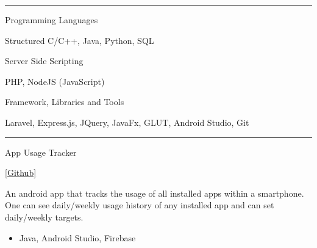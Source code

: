 \documentclass[a4paper,10pt]{article}
\newlength{\cvcolumngapwidth}
\newlength{\cvleftcolumnwidth}
\newlength{\cvrightcolumnwidth}
\newcommand{\cvsectionstyle}[1]{{\normalsize\cvsectionfont\textcolor{cvsectioncolor}{#1}}}
\newcommand{\cvtitlestyle}[1]{{\large\cvtitlefont\textcolor{cvtitlecolor}{#1}}}
\newcommand{\cvheadingstyle}[1]{{\normalsize\cvheadingfont\textcolor{cvheadingcolor}{#1}}}
\newlength{\cvafteritemskipamount}
\newlength{\cvaftersectionskipamount}
\newlength{\cvbetweensectionandheadingextraskipamount}
\newlength{\cvaftertitleskipamount}
\newlength{\cvparskip}
\newcommand{\cvsection}[1]{
    \begin{minipage}[t]{\cvleftcolumnwidth}
        \raggedleft\cvsectionstyle{#1}
    \end{minipage}%
    \hspace{\cvcolumngapwidth}%
    \begin{minipage}[t]{\cvrightcolumnwidth}
        \textcolor{cvrulecolor}{\rule{\cvrightcolumnwidth}{0.3mm}}
    \end{minipage}

    \vspace{\cvaftersectionskipamount}
}
\newcommand{\cvitem}[2]{
    \begin{minipage}[t]{\cvleftcolumnwidth}
        \raggedleft #1
    \end{minipage}%
    \hspace{\cvcolumngapwidth}%
    \begin{minipage}[t]{\cvrightcolumnwidth}
        \setlength{\parskip}{\cvparskip} #2
    \end{minipage}

    \vspace{\cvafteritemskipamount}
}
\newcommand{\cvtitle}[1]{
    \cvtitlestyle{#1}

    \vspace{\cvaftertitleskipamount}
    \vspace{-\cvparskip}
}
\begin{document}

\cvsection{TECHNICAL SKILLS}

\vspace{\cvbetweensectionandheadingextraskipamount}

\cvitem{
    \cvheadingstyle{Programming Languages}
}{
    Structured C/C++, Java, Python, SQL
}

\cvitem{
    \cvheadingstyle{Server Side Scripting}
}{
    PHP, NodeJS (JavaScript)
}

\cvitem{
    \cvheadingstyle{Framework, Libraries and Tools}
}{
     Laravel, Express.js, JQuery, JavaFx, GLUT, Android Studio, Git
}

\cvsection{PROJECTS}

\vspace{\cvbetweensectionandheadingextraskipamount}

\cvitem{
    \cvheadingstyle{App Usage Tracker}
}{
    \cvtitle{\href{https://github.com/diptodeydip/App_Usage_Tracker}{[Github]}}
    An android app that tracks the usage of all installed apps within a smartphone. One can see  daily/weekly usage history of any installed app and can set daily/weekly targets.
    \begin{itemize}[leftmargin=*]
        \item Java, Android Studio, Firebase
    \end{itemize}
}
\end{document}
